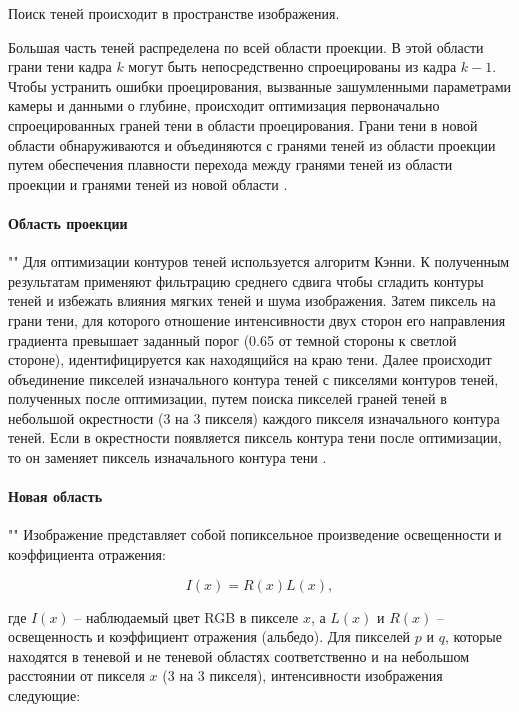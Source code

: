 Поиск теней происходит в пространстве изображения. 

Большая часть теней распределена по всей области проекции. В этой области грани тени кадра $k$ могут быть непосредственно спроецированы из кадра $k - 1$. Чтобы устранить ошибки проецирования, вызванные зашумленными параметрами камеры и данными о глубине, происходит оптимизация первоначально спроецированных граней тени в области проецирования. Грани тени в новой области обнаруживаются и объединяются с гранями теней из области проекции путем обеспечения плавности перехода между гранями теней из области проекции и гранями теней из новой области \cite{wei2019simulating}.

\paragraph*{Область проекции} 
""\newline\indent
Для оптимизации контуров теней используется алгоритм Кэнни. К полученным результатам применяют фильтрацию среднего сдвига чтобы сгладить контуры теней и избежать влияния мягких теней и шума изображения. Затем пиксель на грани тени, для которого отношение интенсивности двух сторон его направления градиента превышает заданный порог (0.65 от темной стороны к светлой стороне), идентифицируется как находящийся на краю тени. Далее происходит объединение пикселей изначального контура теней с пикселями контуров теней, полученных после оптимизации, путем поиска пикселей граней теней в небольшой окрестности (3 на 3 пикселя) каждого пикселя изначального контура теней. Если в окрестности появляется пиксель контура тени после оптимизации, то он заменяет пиксель изначального контура тени \cite{wei2019simulating}.

\paragraph*{Новая область} 
""\newline\indent
Изображение представляет собой попиксельное произведение освещенности и коэффициента отражения: 

\begin{equation}
	I(x) = R(x)L(x), 
\end{equation}

где $I(x)$ -- наблюдаемый цвет RGB в пикселе $x$, а $L(x)$ и $R(x)$ -- освещенность и коэффициент отражения (альбедо). Для пикселей $p$ и $q$, которые находятся в теневой и не теневой областях соответственно и на небольшом расстоянии от пикселя $x$ (3 на 3 пикселя), интенсивности изображения следующие:

